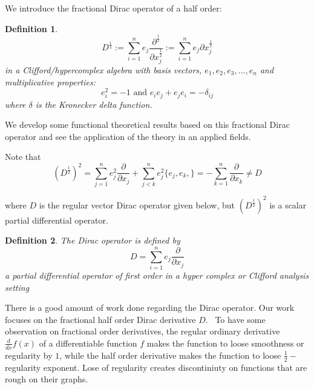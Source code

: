 \documentclass{amsart}%
\theoremstyle{plain}
\newtheorem{definition}{Definition}
\numberwithin{equation}{section}
\begin{document}
We introduce the fractional Dirac operator of a half order:

\begin{definition}%
\[
D^{\frac{1}{2}}:=%
{\displaystyle\sum\limits_{i=1}^{n}}
e_{j}\frac{\partial^{\frac{1}{2}}}{\partial x_{j}^{\frac{1}{2}}}:=%
{\displaystyle\sum\limits_{i=1}^{n}}
e_{j}\partial x_{j}^{\frac{1}{2}}%
\]
in a Clifford/hypercomplex algebra with basis vectors, $e_{1},e_{2}%
,e_{3},...,e_{n}$ and multiplicative properties:
\[
e_{i}^{2}=-1\text{ and }e_{i}e_{j}+e_{j}e_{i}=-\delta_{ij}%
\]
where $\delta$ is the Kronecker delta function.
\end{definition}

We develop some functional theoretical results based on this fractional Dirac
operator and see the application of the theory in an applied fields.

Note that
\[
\left(  D^{\frac{1}{2}}\right)  ^{2}=%
{\displaystyle\sum\limits_{j=1}^{n}}
e_{j}^{2}\frac{\partial}{\partial x_{j}}+%
{\displaystyle\sum\limits_{j<k}^{n}}
e_{j}^{2}\{e_{j},e_{k},\}=-%
{\displaystyle\sum\limits_{k=1}^{n}}
\frac{\partial}{\partial x_{k}}\neq D
\]


where $D$ is the regular vector Dirac operator given below, but $\left(
D^{\frac{1}{2}}\right)  ^{2}$ is a scalar partial differential operator.

\begin{definition}
The Dirac operator is defined by
\[
D=%
{\displaystyle\sum\limits_{i=1}^{n}}
e_{j}\frac{\partial}{\partial x_{j}}%
\]
a partial differential operator of first order in a hyper complex or Clifford
analysis setting \ 
\end{definition}

There is a good amount of work done regarding the Dirac operator. Our work
focuses on the fractional half order Dirac derivative $D$. \ To have some
observation on fractional order derivatives, the regular ordinary derivative
$\frac{d}{dx}f(x)$ of a differentiable function $f$ makes the function to
loose smoothness or regularity by $1$, while the half order derivative makes
the function to loose $\frac{1}{2}-$regularity exponent. Lose of regularity
creates discontiniuty on functions that are rough on their graphs.
\end{document}
